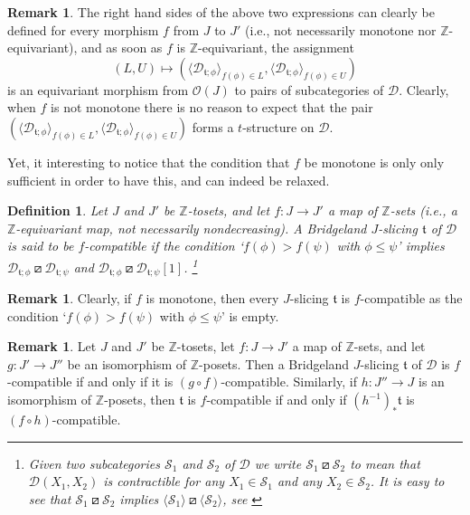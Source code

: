 \documentclass{article}
\newtheorem{defn}[thm]{Definition}
\theoremstyle{definition}
\newtheorem{rem}[thm]{Remark}
\newcommand{\Z}{\mathbb{Z}}
\newcommand{\tee}{\mathfrak{t}}
\newcommand{\orth}{\boxslash}
\begin{document}
\begin{rem}
The right hand sides of the above two expressions can clearly be defined for every morphism $f$ from $J$ to $J'$ (i.e., not necessarily monotone nor $\Z$-equivariant), and as soon as $f$ is $\Z$-equivariant, the assignment
\[
(L,U)\mapsto (\langle \mathscr{D}_{\tee;\phi}\rangle_{f(\phi)\in L},\langle \mathscr{D}_{\tee;\phi}\rangle_{f(\phi)\in U})
\]
is an equivariant morphism from $\mathcal{O}(J)$ to pairs of subcategories of $\mathscr{D}$. Clearly, when $f$ is not monotone there is no reason to expect that the pair $(\langle \mathscr{D}_{\tee;\phi}\rangle_{f(\phi)\in L},\langle \mathscr{D}_{\tee;\phi}\rangle_{f(\phi)\in U})$ forms a $t$-structure on $\mathscr{D}$.
\end{rem}
Yet, it interesting to notice that the condition that $f$ be monotone is only only sufficient in order to have this, and can indeed be relaxed.\\




\begin{defn}\label{compatible}
Let $J$ and $J'$ be $\Z$-tosets, and let $f\colon J\to J'$ a map of $\Z$-sets (i.e., a $\Z$-equivariant map, not necessarily nondecreasing). A Bridgeland $J$-slicing $\tee$ of $\mathscr{D}$ is said to be \emph{$f$-compatible}
if the condition `$f(\phi)>f(\psi)$ with $\phi\leq \psi$' implies $\mathscr{D}_{\tee; \phi}\orth \mathscr{D}_{\tee;\psi}$ and $\mathscr{D}_{\tee; \phi}\orth \mathscr{D}_{\tee;\psi}[1]$.
\footnote{Given two subcategories $\mathscr{S}_1$ and $\mathscr{S}_2$ of $\mathscr{D}$ we write $\mathscr{S}_1\orth \mathscr{S}_2$ to mean that $\mathscr{D}(X_1,X_2)$ is contractible for any $X_1\in \mathscr{S}_1$ and any $X_2\in\mathscr{S}_2$. It is easy to see that $\mathscr{S}_1\orth \mathscr{S}_2$ implies $\langle\mathscr{S}_1\rangle\orth \langle\mathscr{S}_2\rangle$, see \cite[Lemma 4.21]{fosco}}
\end{defn}

\begin{rem}\label{everything-compatible}
Clearly, if $f$ is monotone, then every $J$-slicing $\tee$ is $f$-compatible as the condition `$f(\phi)>f(\psi)$ with $\phi\leq \psi$' is empty.
\end{rem}

\begin{rem}\label{avanti-e-indietro}
Let $J$ and $J'$ be $\Z$-tosets, let $f\colon J\to J'$ a map of $\Z$-sets, and let $g\colon J'\to J''$ be an isomorphism of $\Z$-posets. Then a Bridgeland $J$-slicing $\tee$ of $\mathscr{D}$ is $f$-compatible if and only if it is $(g\circ f)$-compatible. Similarly, if $h\colon J''\to J$ is an isomorphism of $\Z$-posets, then $\tee$ is $f$-compatible if and only if $(h^{-1})_*\tee$ is $(f\circ h)$-compatible.
\end{rem}
\end{document}
